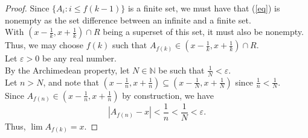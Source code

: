 \documentclass{article}
\begin{document}
\begin{proof}
    Since $\{A_i : i \le f(k-1)\}$ is a finite set, we must have that (\ref{eq}) is nonempty as the set difference between an infinite and a finite set. \\
    With $\left(x-\frac{1}{k},x+\frac{1}{k}\right)\cap R$ being a superset of this set, it must also be nonempty. \\
    Thus, we may choose $f(k)$ such that $A_{f(k)} \in \left(x-\frac{1}{k},x+\frac{1}{k}\right)\cap R$. \\
    Let $\varepsilon > 0$ be any real number. \\
    By the Archimedean property, let $N\in \mathbb N$ be such that $\frac{1}{N} < \varepsilon$. \\
    Let $n > N$, and note that $(x-\frac{1}{n},x+\frac{1}{n})\subseteq (x-\frac{1}{N},x+\frac{1}{N})$ since $\frac{1}{n} < \frac{1}{N}$. \\
    Since $A_{f(n)} \in (x-\frac{1}{n},x+\frac{1}{n})$ by construction, we have 
    \[|A_{f(n)}-x|<\frac{1}{n} < \frac{1}{N} < \varepsilon.\]
    Thus, $\lim A_{f(k)} = x$.
\end{proof}
\end{document}
